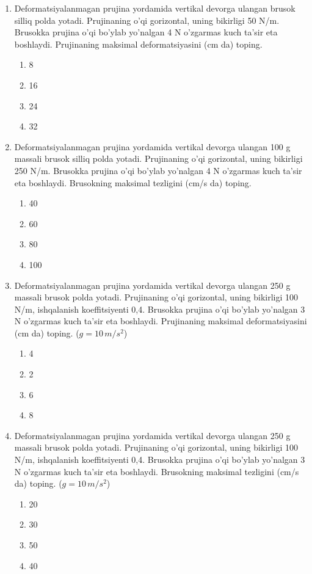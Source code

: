 \begin{enumerate}

\item Deformatsiyalanmagan prujina yordamida vertikal devorga ulangan brusok silliq polda yotadi. Prujinaning o'qi gorizontal, uning bikirligi 50 N/m. Brusokka prujina o'qi bo'ylab yo'nalgan 4 N o'zgarmas kuch ta’sir eta boshlaydi. Prujinaning maksimal deformatsiyasini (cm da) toping.
\begin{enumerate}[label=\Alph*)]
\item 8
\item 16
\item 24
\item 32
\end{enumerate}

\item Deformatsiyalanmagan prujina yordamida vertikal devorga ulangan 100 g massali brusok silliq polda yotadi. Prujinaning o'qi gorizontal, uning bikirligi 250 N/m. Brusokka prujina o'qi bo'ylab yo'nalgan 4 N o'zgarmas kuch ta’sir eta boshlaydi. Brusokning maksimal tezligini (cm/s da) toping.
\begin{enumerate}[label=\Alph*)]
\item 40
\item 60
\item 80
\item 100
\end{enumerate}

\item Deformatsiyalanmagan prujina yordamida vertikal devorga ulangan 250 g massali brusok polda yotadi. Prujinaning o'qi gorizontal, uning bikirligi 100 N/m, ishqalanish koeffitsiyenti 0,4. Brusokka prujina o'qi bo'ylab yo'nalgan 3 N o'zgarmas kuch ta’sir eta boshlaydi. Prujinaning maksimal deformatsiyasini (cm da) toping. ($g = 10 \, m/s^2$)
\begin{enumerate}[label=\Alph*)]
\item 4
\item 2
\item 6
\item 8
\end{enumerate}

\item Deformatsiyalanmagan prujina yordamida vertikal devorga ulangan 250 g massali brusok polda yotadi. Prujinaning o'qi gorizontal, uning bikirligi 100 N/m, ishqalanish koeffitsiyenti 0,4. Brusokka prujina o'qi bo'ylab yo'nalgan 3 N o'zgarmas kuch ta’sir eta boshlaydi. Brusokning maksimal tezligini (cm/s da) toping. ($g = 10 \, m/s^2$)
\begin{enumerate}[label=\Alph*)]
\item 20
\item 30
\item 50
\item 40
\end{enumerate}


\end{enumerate}
